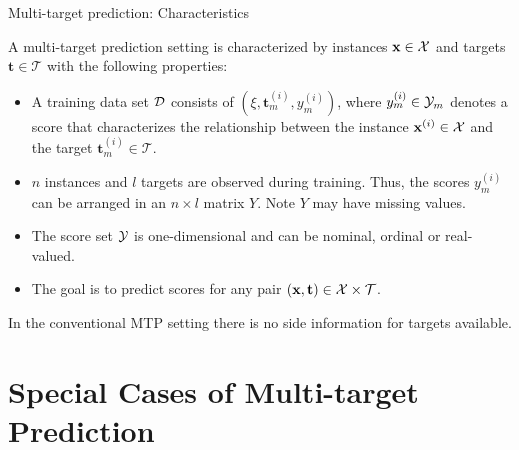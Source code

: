 \documentclass[11pt,compress,t,notes=noshow, xcolor=table]{beamer}
\newcommand{\Tspace}{\mathcal{T}}
\newcommand{\tv}{\mathbf{t}}
\newcommand{\tim}{\mathbf{t}^{(i)}_m}
\newcommand{\yim}{y^{(i)}_m}
\begin{document}
\begin{frame}{Multi-target prediction: Characteristics}

	\small
		A multi-target prediction setting is characterized by instances $\mathbf{x} \in \mathcal{X}$ and targets $\tv \in \Tspace$ with the following properties: 

		\begin{itemize} \small
	
			\item A training data set $\mathcal{D}$ consists of $(\xi,\tim, \yim)$, where $\yim \in \Yspace_m$ denotes a score that characterizes the relationship between the instance $\mathbf{x}^{(i)} \in \mathcal{X}$ and the target $\tim \in \Tspace$.  
			
			\item $n$ instances and $l$ targets are observed during training. Thus, the scores $\yim$ can be arranged in an $n \times l$ matrix $Y$. Note $Y$ may have missing values.
	
			\item The score set $\mathcal{Y}$ is one-dimensional and can be nominal, ordinal or real-valued.  
		
			\item The goal is to predict scores for any pair $(\xv,\tv) \in \Xspace \times \Tspace$.  
            \vspace{10pt}
		
		\end{itemize}
% 
%
In the conventional MTP setting there is no side information for targets available. 
%	
%
\end{frame}

\section{Special Cases of Multi-target Prediction}
\end{document}
